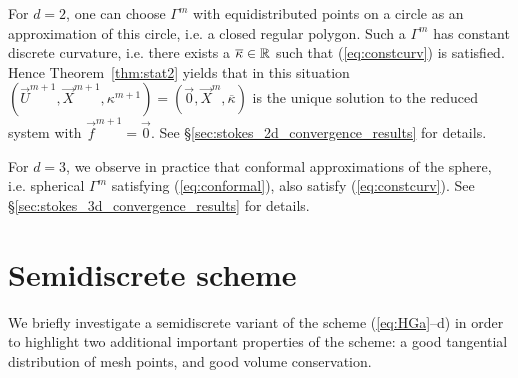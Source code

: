 For $d=2$, one can choose $\Gamma^m$ with equidistributed points on a circle as
an approximation of this circle, i.e. a closed regular polygon.
Such a $\Gamma^m$ has constant discrete curvature, i.e. there exists a
$\overline{\kappa} \in {\mathbb R}$ such that (\ref{eq:constcurv}) is satisfied.
Hence Theorem~\ref{thm:stat2} yields that in this situation $(\vec
U^{m+1}, \vec X^{m+1}, \kappa^{m+1}) = (\vec 0, \vec X^m,\overline{\kappa})$ is
the unique solution to the reduced system with $\vec f^{m+1} =\vec 0$. See
\S\ref{sec:stokes_2d_convergence_results} for details.

For $d=3$, we observe in practice that conformal approximations of the sphere,
i.e. spherical $\Gamma^m$ satisfying (\ref{eq:conformal}), also satisfy
(\ref{eq:constcurv}). See \S\ref{sec:stokes_3d_convergence_results} for details.

\section{Semidiscrete scheme}\label{sec:stokes_semi_fem}
We briefly investigate a semidiscrete variant of the scheme (\ref{eq:HGa}--d)
in order to highlight two additional important properties of the scheme: a
good tangential distribution of mesh points, and good volume conservation.

